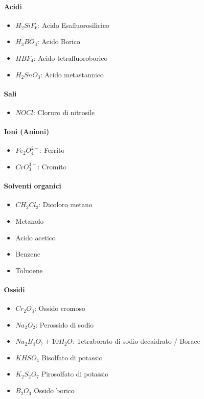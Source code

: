 \documentclass{article}
\begin{document}
\paragraph{Acidi}
\begin{itemize}
	\item $H_2SiF_6$: Acido Esafluorosilicico
	\item $H_3BO_3$: Acido Borico
	\item $HBF_4$: Acido tetrafluoroborico
	\item $H_2SnO_3$: Acido metastannico
\end{itemize}

\paragraph{Sali}
\begin{itemize}
	\item $NOCl$: Cloruro di nitrosile
\end{itemize}

\paragraph{Ioni (Anioni)}
\begin{itemize}
	\item $Fe_2O_4^{2-}$: Ferrito
	\item $CrO_3^{3-}$: Cromito
\end{itemize}

\paragraph{Solventi organici}
\begin{itemize}
	\item $CH_2Cl_2$: Dicoloro metano
	\item Metanolo
	\item Acido acetico
	\item Benzene 
	\item Toluoene
\end{itemize}

\paragraph{Ossidi}
\begin{itemize}
	\item $Cr_2O_3$: Ossido cromoso
	\item $Na_2O_2$: Perossido di sodio
	\item $Na_2B_4O_7 + 10H_2O$: Tetraborato di sodio decaidrato / Borace
	\item $KHSO_4$ Bisolfato di potassio
	\item $K_2S_2O_7$ Pirosolfato di potassio
	\item $B_2O_3$ Ossido borico
\end{itemize}
\end{document}
